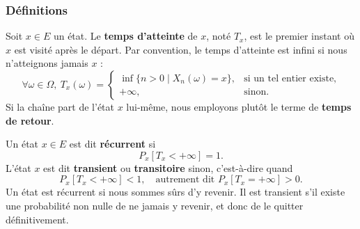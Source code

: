 \subsubsection{Définitions}

\begin{definition}[7.7]
Soit $x \in E$ un état. Le \textbf{temps d’atteinte} de $x$, noté $T_x$, est le premier instant où $x$ est visité après le départ. Par convention, le temps d’atteinte est infini si nous n’atteignons jamais $x$ :
\[
\forall \omega \in \Omega, \ T_x(\omega) =
\begin{cases}
\inf\{n > 0 \mid X_n(\omega) = x\}, & \text{si un tel entier existe,} \\
+\infty, & \text{sinon.}
\end{cases}
\]
Si la chaîne part de l’état $x$ lui-même, nous employons plutôt le terme de \textbf{temps de retour}.
\end{definition}

\begin{definition}[7.8]
Un état $x \in E$ est dit \textbf{récurrent} si
\[
P_x[T_x < +\infty] = 1.
\]
L’état $x$ est dit \textbf{transient} ou \textbf{transitoire} sinon, c’est-à-dire quand
\[
P_x[T_x < +\infty] < 1, \quad \text{autrement dit } P_x[T_x = +\infty] > 0.
\]
Un état est récurrent si nous sommes sûrs d’y revenir. Il est transient s’il existe une probabilité non nulle de ne jamais y revenir, et donc de le quitter définitivement.
\end{definition}